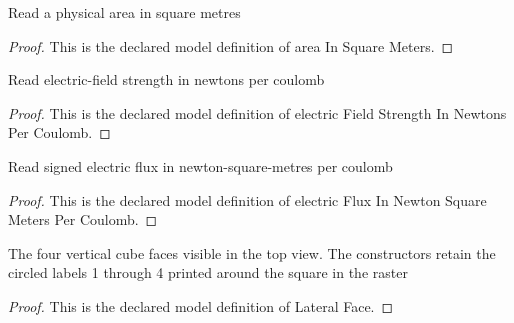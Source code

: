 \begin{definition}
  \label{def:physics:phyx-mini-0850:phyxminiproblems-problemphyxmini0850-areainsquaremeters}
  Read a physical area in square metres
\end{definition}
\begin{proof}
  This is the declared model definition of area In Square Meters.
\end{proof}
\begin{definition}
  \label{def:physics:phyx-mini-0850:phyxminiproblems-problemphyxmini0850-electricfieldstrengthinnewtonspercoulomb}
  Read electric-field strength in newtons per coulomb
\end{definition}
\begin{proof}
  This is the declared model definition of electric Field Strength In Newtons Per Coulomb.
\end{proof}
\begin{definition}
  \label{def:physics:phyx-mini-0850:phyxminiproblems-problemphyxmini0850-electricfluxinnewtonsquaremeterspercoulomb}
  Read signed electric flux in newton-square-metres per coulomb
\end{definition}
\begin{proof}
  This is the declared model definition of electric Flux In Newton Square Meters Per Coulomb.
\end{proof}
\begin{definition}
  \label{def:physics:phyx-mini-0850:phyxminiproblems-problemphyxmini0850-lateralface}
  The four vertical cube faces visible in the top view. The constructors retain the circled labels 1 through 4 printed around the square in the raster
\end{definition}
\begin{proof}
  This is the declared model definition of Lateral Face.
\end{proof}
